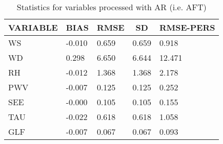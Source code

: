 \documentclass[11pt,english]{article}
\begin{document}
\begin{table}[]
\begin{center}
\begin{tabular}{|l|l|l|l|l|}
\hline
\multicolumn{1}{c|}{\cellcolor[HTML]{C0C0C0}\textbf{VARIABLE}} & \multicolumn{1}{c|}{\cellcolor[HTML]{C0C0C0}\textbf{BIAS}} & \multicolumn{1}{c|}{\cellcolor[HTML]{C0C0C0}\textbf{RMSE}} & \multicolumn{1}{c|}{\cellcolor[HTML]{C0C0C0}\textbf{SD}} & \multicolumn{1}{c|}{\cellcolor[HTML]{C0C0C0}\textbf{RMSE-PERS}}\\\hline
\cellcolor[HTML]{C0C0C0}WS  &    -0.010                                &     0.659                                &     0.659  &     0.918 \\
\cellcolor[HTML]{C0C0C0}WD  &     0.298                                &     6.650                                &     6.644  &    12.471 \\
\cellcolor[HTML]{C0C0C0}RH  &    -0.012                                &     1.368                                &     1.368  &     2.178 \\
\cellcolor[HTML]{C0C0C0}PWV &    -0.007                               &     0.125                               &     0.125 &     0.252 \\
\cellcolor[HTML]{C0C0C0}SEE &    -0.000                               &     0.105                               &     0.105 &     0.155 \\
\cellcolor[HTML]{C0C0C0}TAU &    -0.022                               &     0.618                               &     0.618 &     1.058 \\
\cellcolor[HTML]{C0C0C0}GLF &    -0.007                               &     0.067                               &     0.067 &     0.093 \\
\hline
\end{tabular}
\caption{Statistics for variables processed with AR (i.e. AFT)}
\end{center}
\end{table}

\newpage
\end{document}
